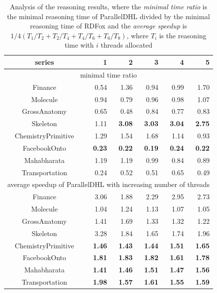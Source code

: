 \begin{table}[htb]
\centering
\caption{Analysis of the reasoning results, where the \emph{minimal time
  ratio} is the minimal reasoning time
of ParallelDHL divided by the minimal reasoning time of RDFox and the
\emph{average speedup} is $1/4 (T_1/T_2 + T_2/T_4 + T_4/T_6 + T_6/T_8)$,
 where $T_i$ is the reasoning time with $i$ threads allocated}
{\setlength{\tabcolsep}{6mm}
\begin{tabular}{crrrrr}
\hline
series & 1 & 2 & 3 & 4 & 5\\
\hline
\multicolumn{6}{c}{minimal time ratio}\\%
\hline
Finance&0.54&1.36&0.94&0.99&1.70\\
Molecule&0.94&0.79&0.96&0.98&1.07\\
GrossAnatomy&0.65&0.48&0.84&0.77&0.83\\
Skeleton&1.11&\textbf{3.08}&\textbf{3.03}&\textbf{3.04}&\textbf{2.75}\\
ChemistryPrimitive&1.29&1.54&1.68&1.14&0.93\\
FacebookOnto&\textbf{0.23}&\textbf{0.22}&\textbf{0.19}&\textbf{0.24}&\textbf{0.22}\\
Mahabharata&1.19&1.19&0.99&0.84&0.89\\
Transportation&0.24&0.52&0.51&0.65&0.49\\
\hline
\multicolumn{6}{c}{average speedup of ParallelDHL with increasing
  number of threads}\\%
\hline
Finance&3.06&1.88&2.29&2.95&2.73\\
Molecule&1.04&1.24&1.13&1.07&1.05\\
GrossAnatomy&1.41&1.69&1.33&1.32&1.22\\
Skeleton&3.28&1.84&1.65&1.74&1.96\\
ChemistryPrimitive&\textbf{1.46}&\textbf{1.43}&\textbf{1.44}&\textbf{1.51}&\textbf{1.65}\\
FacebookOnto&\textbf{1.81}&\textbf{1.83}&\textbf{1.82}&\textbf{1.61}&\textbf{1.78}\\
Mahabharata&\textbf{1.41}&\textbf{1.46}&\textbf{1.51}&\textbf{1.47}&\textbf{1.56}\\
Transportation&\textbf{1.98}&\textbf{1.57}&\textbf{1.61}&\textbf{1.55}&\textbf{1.59}\\

\end{tabular}}
\end{table}
